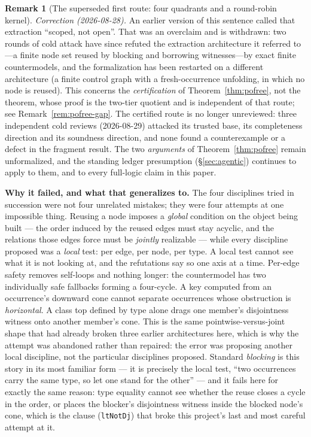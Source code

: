 \documentclass[11pt]{article}
\newcommand{\code}[1]{\texttt{#1}}
\theoremstyle{plain}
\theoremstyle{definition}
\newtheorem{remark}[theorem]{Remark}
\begin{document}
\begin{remark}[The superseded first route: four quadrants and a round-robin
kernel]
\emph{Correction (2026-08-28).} An earlier version of this sentence called that
extraction ``scoped, not open''. That was an overclaim and is withdrawn: two
rounds of cold attack have since refuted the extraction architecture it referred
to---a finite node set reused by blocking and borrowing witnesses---by exact
finite countermodels, and the formalization has been restarted on a different
architecture (a finite control graph with a fresh-occurrence unfolding, in which
no node is reused). This concerns the \emph{certification} of
Theorem~\ref{thm:pofree}, not the theorem, whose proof is the two-tier quotient
and is independent of that route; see Remark~\ref{rem:pofree-gap}. The certified route is
no longer unreviewed: three independent cold reviews (2026-08-29) attacked its
trusted base, its completeness direction and its soundness direction, and none
found a counterexample or a defect in the fragment result. The two
\emph{arguments} of Theorem~\ref{thm:pofree} remain unformalized, and the
standing ledger presumption (\S\ref{sec:agentic}) continues to apply to them,
and to every full-logic claim in this paper.

\medskip
\textbf{Why it failed, and what that generalizes to.} The four disciplines
tried in succession were not four unrelated mistakes; they were four attempts
at one impossible thing. Reusing a node imposes a \emph{global} condition on the
object being built --- the order induced by the reused edges must stay acyclic,
and the relations those edges force must be \emph{jointly} realizable --- while
every discipline proposed was a \emph{local} test: per edge, per node, per type.
A local test cannot see what it is not looking at, and the refutations say so
one axis at a time. Per-edge safety removes self-loops and nothing longer: the
countermodel has two individually safe fallbacks forming a four-cycle. A key
computed from an occurrence's downward cone cannot separate occurrences whose
obstruction is \emph{horizontal}. A class top defined by type alone drags one
member's disjointness witness onto another member's cone. This is the same
pointwise-versus-joint shape that had already broken three earlier
architectures here, which is why the attempt was abandoned rather than
repaired: the error was proposing another local discipline, not the particular
disciplines proposed. Standard \emph{blocking} is this story in its most
familiar form --- it is precisely the local test, ``two occurrences carry the
same type, so let one stand for the other'' --- and it fails here for exactly
the same reason: type equality cannot see whether the reuse closes a cycle in
the order, or places the blocker's disjointness witness inside the blocked
node's cone, which is the clause (\code{ltNotDj}) that broke this project's
last and most careful attempt at it.


\end{remark}
\end{document}
